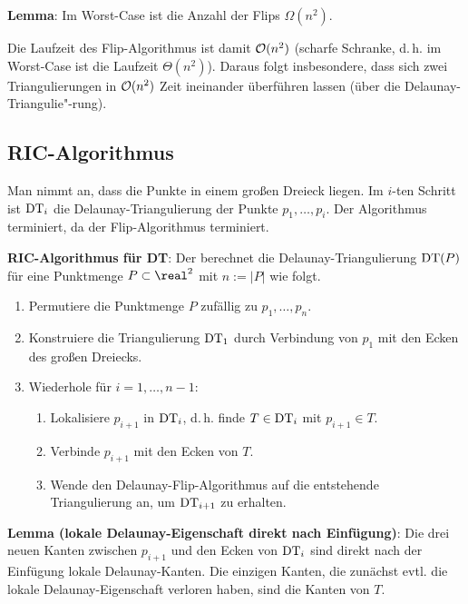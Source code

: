 \textbf{Lemma}:
Im Worst-Case ist die Anzahl der Flips $\Omega(n^2)$.

\linie

Die Laufzeit des Flip-Algorithmus ist damit $\mathcal{O}(n^2)$
(scharfe Schranke, d.\,h. im Worst-Case ist die Laufzeit $\Theta(n^2)$).
Daraus folgt insbesondere, dass sich zwei Triangulierungen in $\mathcal{O}(n^2)$ Zeit ineinander
überführen lassen (über die Delaunay-Triangulie"-rung).

\pagebreak

\subsection{%
    RIC-Algorithmus%
}

Man nimmt an, dass die Punkte in einem großen Dreieck liegen.
Im $i$-ten Schritt ist $\operatorname{DT}_i$
die Delaunay-Triangulierung der Punkte $p_1, \dotsc, p_i$.
Der Algorithmus terminiert, da der Flip-Algorithmus terminiert.

\textbf{RIC-Algorithmus für DT}:
Der  berechnet die Delaunay-Triangulierung $\operatorname{DT}(P)$
für eine Punktmenge $P \subset \real^2$ mit $n := |P|$ wie folgt.
\begin{enumerate}
    \item
    Permutiere die Punktmenge $P$ zufällig zu $p_1, \dotsc, p_n$.
    
    \item
    Konstruiere die Triangulierung $\operatorname{DT}_1$ durch Verbindung von $p_1$ mit den Ecken des
    großen Dreiecks.
    
    \item
    Wiederhole für $i = 1, \dotsc, n - 1$:
    \begin{enumerate}
        \item
        Lokalisiere $p_{i+1}$ in $\operatorname{DT}_i$, d.\,h. finde $T \in \operatorname{DT}_i$ mit $p_{i+1} \in T$.
        
        \item
        Verbinde $p_{i+1}$ mit den Ecken von $T$.
        
        \item
        Wende den Delaunay-Flip-Algorithmus auf die entstehende Triangulierung an,
        um $\operatorname{DT}_{i+1}$ zu erhalten.
    \end{enumerate}
\end{enumerate}

\linie

\textbf{Lemma (lokale Delaunay-Eigenschaft direkt nach Einfügung)}:
Die drei neuen Kanten zwischen $p_{i+1}$ und den Ecken von $\operatorname{DT}_i$
sind direkt nach der Einfügung lokale Delaunay-Kanten.
Die einzigen Kanten, die zunächst evtl. die lokale Delaunay-Eigenschaft verloren haben,
sind die Kanten von $T$.

